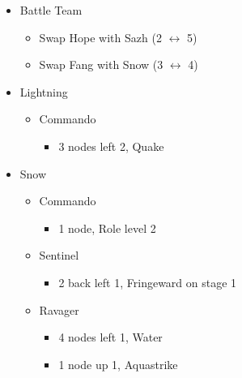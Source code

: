 \renewcommand{\fifth}{[5] Cerberus (\com/\com/\com)}
\renewcommand{\sixth}{[6] Cerberus (\com/\com/\com)}
\begin{multicols}{2}
\begin{menu}
\begin{itemize}
    \paradigm
    \begin{itemize}
        \item Battle Team
        \begin{itemize}
            \item Swap Hope with Sazh (2 $\leftrightarrow$ 5)
            \item Swap Fang with Snow (3 $\leftrightarrow$ 4)
        \end{itemize}
{\paradigmline[1]{\textit{\com}}{\textit{\syn}}{\textit{(\com)}}}%
{\paradigmline{(\rav)}{\rav}{\rav}}%
{\paradigmline{(\com)}{\syn}{\sen}}%
{\paradigmline{[\rav]}{(\rav)}{(\rav)}}%
{\paradigmline{\com}{[\com]}{\com}}%
{\paradigmline{\com}{[\com]}{\com}}
    \end{itemize}
    \crystarium
    \begin{itemize}
        \item Lightning
        \begin{itemize}
            \item Commando
            \begin{itemize}
                \item 3 nodes left 2, Quake
            \end{itemize}
        \end{itemize}
        \item Snow
        \begin{itemize}
            \item Commando
            \begin{itemize}
                \item 1 node, Role level 2
            \end{itemize}
            \item Sentinel
            \begin{itemize}
                \item 2 back left 1, Fringeward on stage 1
            \end{itemize}
            \item Ravager
            \begin{itemize}
                \item 4 nodes left 1, Water
                \item 1 node up 1, Aquastrike

\end{itemize}
\end{itemize}
\end{itemize}
\end{itemize}
\end{menu}
\end{multicols}
